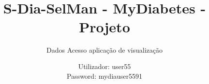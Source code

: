 \documentclass[handout]{beamer}
\title{S-Dia-SelMan - MyDiabetes - Projeto}
\subtitle{Dados Acesso aplicação de visualização}
\author{Utilizador: user55\\
Password: mydiauser5591}
\date{}
\institute{\url{mydiabetes@dcc.fc.up.pt}\\\url{http://mydiabetes.dcc.fc.up.pt/}}
\begin{document}
\begin{frame}[plain,t]
\titlepage
\end{frame}
\end{document}
